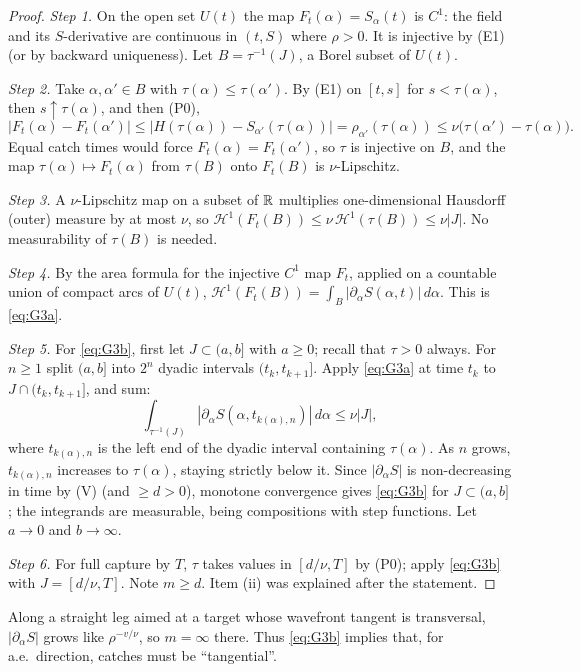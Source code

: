 \begin{proof}
\emph{Step 1.} On the open set $U(t)$ the map $F_t(\alpha)=S_\alpha(t)$ is $C^1$: the field and its $S$-derivative are continuous in
$(t,S)$ where $\rho>0$. It is injective by (E1) (or by backward uniqueness). Let $B=\tau^{-1}(J)$, a Borel subset of $U(t)$.

\emph{Step 2.} Take $\alpha,\alpha'\in B$ with $\tau(\alpha)\le\tau(\alpha')$. By (E1) on $[t,s]$ for $s<\tau(\alpha)$, then $s\uparrow\tau(\alpha)$, and then (P0),
\[
|F_t(\alpha)-F_t(\alpha')|\le|H(\tau(\alpha))-S_{\alpha'}(\tau(\alpha))|=\rho_{\alpha'}(\tau(\alpha))\le\nu\bigl(\tau(\alpha')-\tau(\alpha)\bigr).
\]
Equal catch times would force $F_t(\alpha)=F_t(\alpha')$, so $\tau$ is injective on $B$, and the map $\tau(\alpha)\mapsto F_t(\alpha)$ from
$\tau(B)$ onto $F_t(B)$ is $\nu$-Lipschitz.

\emph{Step 3.} A $\nu$-Lipschitz map on a subset of $\mathbb{R}$ multiplies one-dimensional Hausdorff (outer) measure by at most $\nu$, so
$\mathcal H^1(F_t(B))\le\nu\,\mathcal H^1(\tau(B))\le\nu|J|$. No measurability of $\tau(B)$ is needed.

\emph{Step 4.} By the area formula for the injective $C^1$ map $F_t$, applied on a countable union of compact arcs of $U(t)$,
$\mathcal H^1(F_t(B))=\int_B|\partial_\alpha S(\alpha,t)|\,d\alpha$. This is \eqref{eq:G3a}.

\emph{Step 5.} For \eqref{eq:G3b}, first let $J\subset(a,b]$ with $a\ge0$; recall that $\tau>0$ always. For $n\ge1$ split $(a,b]$ into
$2^n$ dyadic intervals $(t_k,t_{k+1}]$. Apply \eqref{eq:G3a} at time $t_k$ to $J\cap(t_k,t_{k+1}]$, and sum:
\[
\int_{\tau^{-1}(J)}|\partial_\alpha S(\alpha,t_{k(\alpha),n})|\,d\alpha\le\nu|J| ,
\]
where $t_{k(\alpha),n}$ is the left end of the dyadic interval containing $\tau(\alpha)$. As $n$ grows, $t_{k(\alpha),n}$ increases to
$\tau(\alpha)$, staying strictly below it. Since $|\partial_\alpha S|$ is non-decreasing in time by (V) (and $\ge d>0$), monotone convergence
gives \eqref{eq:G3b} for $J\subset(a,b]$; the integrands are measurable, being compositions with step functions. Let $a\to0$ and
$b\to\infty$.

\emph{Step 6.} For full capture by $T$, $\tau$ takes values in $[d/\nu,T]$ by (P0); apply \eqref{eq:G3b} with $J=[d/\nu,T]$. Note
$m\ge d$. Item (ii) was explained after the statement.
\end{proof}

\begin{remark}
Along a straight leg aimed at a target whose wavefront tangent is transversal, $|\partial_\alpha S|$ grows like $\rho^{-v/\nu}$, so
$m=\infty$ there. Thus \eqref{eq:G3b} implies that, for a.e.\ direction, catches must be ``tangential''.
\end{remark}

